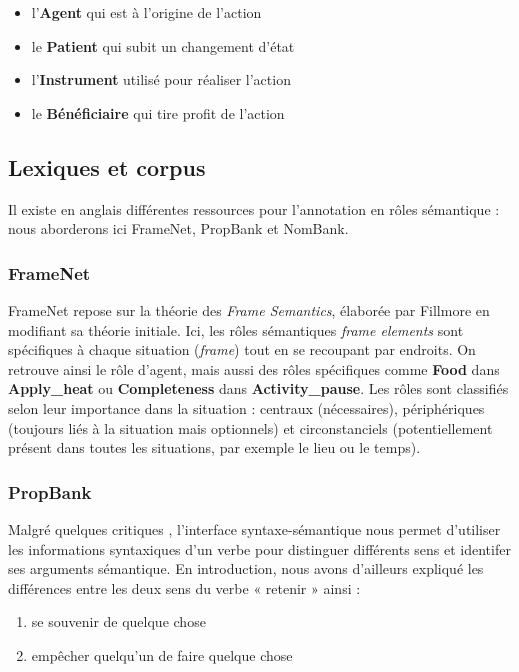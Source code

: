 \begin{itemize}
    \item l'\textbf{Agent} qui est à l'origine de l'action
    \item le \textbf{Patient} qui subit un changement d'état
    \item l'\textbf{Instrument} utilisé pour réaliser l'action
    \item le \textbf{Bénéficiaire} qui tire profit de l'action
\end{itemize}

\subsection{Lexiques et corpus}

Il existe en anglais différentes ressources pour l'annotation en rôles
sémantique : nous aborderons ici FrameNet, PropBank et NomBank.

\subsubsection{FrameNet}

FrameNet repose sur la théorie des \textit{Frame Semantics}, élaborée par
Fillmore en modifiant sa théorie initiale. Ici, les rôles sémantiques
\textit{frame elements} sont spécifiques à chaque situation (\textit{frame})
tout en se recoupant par endroits. On retrouve ainsi le rôle d'agent, mais
aussi des rôles spécifiques comme \textbf{Food} dans \textbf{Apply\_heat} ou
\textbf{Completeness} dans \textbf{Activity\_pause}. Les rôles sont classifiés
selon leur importance dans la situation : centraux (nécessaires), périphériques
(toujours liés à la situation mais optionnels) et circonstanciels
(potentiellement présent dans toutes les situations, par exemple le lieu ou le
temps).

\subsubsection{PropBank}

Malgré quelques critiques \citep{riemer2011conception}, l'interface
syntaxe-sémantique nous permet d'utiliser les informations syntaxiques d'un
verbe pour distinguer différents sens et identifer ses arguments sémantique. En
introduction, nous avons d'ailleurs expliqué les différences entre les deux
sens du verbe « retenir » ainsi :

\begin{enumerate}
    \item se souvenir de quelque chose
    \item empêcher quelqu'un de faire quelque chose
\end{enumerate}

